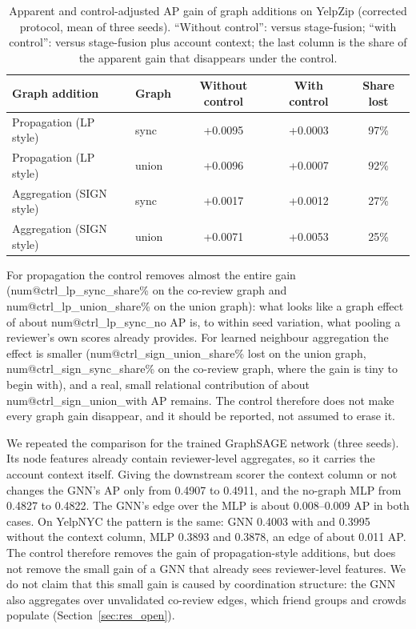 \documentclass[pdflatex,sn-basic]{sn-jnl}
\makeatletter
\theoremstyle{thmstyleone}
\theoremstyle{thmstylethree}
\newcommand{\num}[1]{\csname num@#1\endcsname}
\makeatother
\begin{document}
\begin{table}[t]
\caption{Apparent and control-adjusted AP gain of graph additions on YelpZip (corrected protocol, mean of three seeds). ``Without control'': versus stage-fusion; ``with control'': versus stage-fusion plus account context; the last column is the share of the apparent gain that disappears under the control.}\label{tab:ctrl}
\footnotesize\setlength{\tabcolsep}{3pt}
\begin{tabular}{@{}llccc@{}}
\toprule
Graph addition & Graph & Without control & With control & Share lost \\
\midrule
Propagation (LP style) & sync & +0.0095 & +0.0003 & 97\% \\
Propagation (LP style) & union & +0.0096 & +0.0007 & 92\% \\
Aggregation (SIGN style) & sync & +0.0017 & +0.0012 & 27\% \\
Aggregation (SIGN style) & union & +0.0071 & +0.0053 & 25\% \\
\bottomrule
\end{tabular}
\end{table}

For propagation the control removes almost the entire gain (\num{ctrl_lp_sync_share}\% on the co-review graph and \num{ctrl_lp_union_share}\% on the union graph): what looks like a graph effect of about \num{ctrl_lp_sync_no} AP is, to within seed variation, what pooling a reviewer's own scores already provides. For learned neighbour aggregation the effect is smaller (\num{ctrl_sign_union_share}\% lost on the union graph, \num{ctrl_sign_sync_share}\% on the co-review graph, where the gain is tiny to begin with), and a real, small relational contribution of about \num{ctrl_sign_union_with} AP remains. The control therefore does not make every graph gain disappear, and it should be reported, not assumed to erase it.

We repeated the comparison for the trained GraphSAGE network (three seeds). Its node features already contain reviewer-level aggregates, so it carries the account context itself. Giving the downstream scorer the context column or not changes the GNN's AP only from 0.4907 to 0.4911, and the no-graph MLP from 0.4827 to 0.4822. The GNN's edge over the MLP is about 0.008--0.009 AP in both cases. On YelpNYC the pattern is the same: GNN 0.4003 with and 0.3995 without the context column, MLP 0.3893 and 0.3878, an edge of about 0.011 AP. The control therefore removes the gain of propagation-style additions, but does not remove the small gain of a GNN that already sees reviewer-level features. We do not claim that this small gain is caused by coordination structure: the GNN also aggregates over unvalidated co-review edges, which friend groups and crowds populate (Section~\ref{sec:res_open}).
\end{document}
